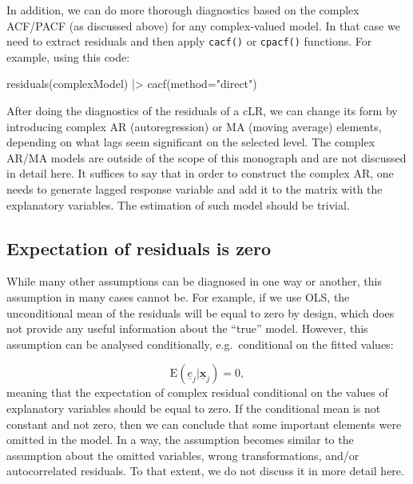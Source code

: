 \documentclass[
]{book}
\newenvironment{Shaded}{\begin{snugshade}}{\end{snugshade}}
\newcommand{\AttributeTok}[1]{\textcolor[rgb]{0.77,0.63,0.00}{#1}}
\newcommand{\FunctionTok}[1]{\textcolor[rgb]{0.00,0.00,0.00}{#1}}
\newcommand{\NormalTok}[1]{#1}
\newcommand{\SpecialCharTok}[1]{\textcolor[rgb]{0.00,0.00,0.00}{#1}}
\newcommand{\StringTok}[1]{\textcolor[rgb]{0.31,0.60,0.02}{#1}}
\begin{document}
In addition, we can do more thorough diagnostics based on the complex ACF/PACF (as discussed above) for any complex-valued model. In that case we need to extract residuals and then apply \texttt{cacf()} or \texttt{cpacf()} functions. For example, using this code:

\begin{Shaded}
\begin{Highlighting}[]
\FunctionTok{residuals}\NormalTok{(complexModel) }\SpecialCharTok{|\textgreater{}}
    \FunctionTok{cacf}\NormalTok{(}\AttributeTok{method=}\StringTok{"direct"}\NormalTok{)}
\end{Highlighting}
\end{Shaded}

After doing the diagnostics of the residuals of a cLR, we can change its form by introducing complex AR (autoregression) or MA (moving average) elements, depending on what lags seem significant on the selected level. The complex AR/MA models are outside of the scope of this monograph and are not discussed in detail here. It suffices to say that in order to construct the complex AR, one needs to generate lagged response variable and add it to the matrix with the explanatory variables. The estimation of such model should be trivial.

\hypertarget{expectation-of-residuals-is-zero}{%
\subsection{Expectation of residuals is zero}\label{expectation-of-residuals-is-zero}}

While many other assumptions can be diagnosed in one way or another, this assumption in many cases cannot be. For example, if we use OLS, the unconditional mean of the residuals will be equal to zero by design, which does not provide any useful information about the ``true'' model. However, this assumption can be analysed conditionally, e.g.~conditional on the fitted values:

\begin{equation}
    \mathrm{E}(\underline{e}_j | \underline{\mathbf{x}}_j)=0 ,
    \label{eq:residsExpectation}
\end{equation}
meaning that the expectation of complex residual conditional on the values of explanatory variables should be equal to zero. If the conditional mean is not constant and not zero, then we can conclude that some important elements were omitted in the model. In a way, the assumption becomes similar to the assumption about the omitted variables, wrong transformations, and/or autocorrelated residuals. To that extent, we do not discuss it in more detail here.
\end{document}

